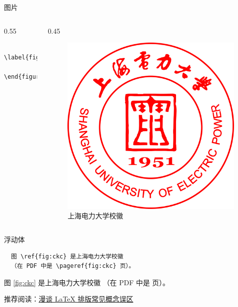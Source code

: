 \begin{frame}[fragile]{图片}
\begin{columns}
\begin{column}{0.55\textwidth}
\begin{verbatim}
    \label{fig:suep:LOGO}
  \end{figure}
          \end{verbatim}
      \end{column}
      \begin{column}{0.45\textwidth}
          \scriptsize
  \begin{figure}
      \centering
      \includegraphics[width=.6\textwidth]{logo/logo.png}
      \caption{上海电力大学校徽}
      \label{fig:suep:LOGO}
  \end{figure}
      \end{column}
  \end{columns}
\end{frame}
  
\begin{frame}[fragile]{浮动体}
  \pause
  \begin{verbatim}
  图 \ref{fig:ckc} 是上海电力大学校徽
  （在 PDF 中是 \pageref{fig:ckc} 页）。
  \end{verbatim}
  图 \ref{fig:ckc} 是上海电力大学校徽
  （在 PDF 中是 \pageref{fig:ckc} 页）。
  
  推荐阅读：\href{http://static.latexstudio.net/wp-content/uploads/2018/03/LianTze-presentation-0320-forReading.pdf}{漫谈 \LaTeX{} 排版常见概念误区}
\end{frame}
  
